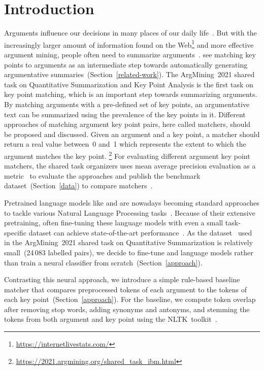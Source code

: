 \section{Introduction}\label{introduction}

Arguments influence our decisions in many places of our daily life~\cite{Bar-HaimEFKLS2020}.
But with the increasingly larger amount of information found on the Web\footnote{\url{https://internetlivestats.com/}} 
and more effective argument mining, people often need to summarize arguments~\cite{LawrenceR2019,Bar-HaimEFKLS2020}.
\citet{Bar-HaimEFKLS2020} see matching key points to arguments as an intermediate step towards automatically generating 
argumentative summaries~(Section~\ref{related-work}).
The ArgMining~2021 shared task on Quantitative Summarization and Key Point Analysis is the first task on key point matching, 
which is an important step towards summarizing arguments. By matching arguments with a pre-defined set of key points, an argumentative text can be summarized using the prevalence of the key points in it.
Different approaches of matching argument key point pairs, here called matchers, should be proposed and discussed.%
Given an argument and a key point, a matcher should return a real value between~0 and~1 which represents the extent to which the argument matches the key point.
\footnote{\url{https://2021.argmining.org/shared_task_ibm.html}}
For evaluating different argument key point matchers, the shared task organizers uses mean average 
precision evaluation as a metric~\cite{kpa-2021-overview} to evaluate the approaches and publish the \ArgKP benchmark dataset~(Section~\ref{data}) to compare 
matchers~\cite{Bar-HaimEFKLS2020}. %

Pretrained language models like \Bert and \Roberta are nowadays becoming standard approaches to tackle various Natural 
Language Processing tasks~\cite{DevlinCLT2019,LiuOGDJCLLZS2019}.
Because of their extensive pretraining, often fine-tuning these language models with even a small task-specific dataset 
can achieve state-of-the-art performance~\cite{DevlinCLT2019}.
As the \ArgKP dataset~\cite{Bar-HaimEFKLS2020} used in the ArgMining~2021 shared task on Quantitative Summarization is 
relatively small~(24\,083 labelled pairs), we decide to fine-tune \Bert and \Roberta language models rather than train 
a neural classifier from scratch~(Section~\ref{approach}).

Contrasting this neural approach, we introduce a simple rule-based baseline matcher that compares preprocessed tokens of 
each argument to the tokens of each key point~(Section~\ref{approach}).
For the baseline, we compute token overlap after removing stop words, adding synonyms and antonyms, and stemming the 
tokens from both argument and key point using the NLTK~toolkit~\cite{BirdL2004}.


